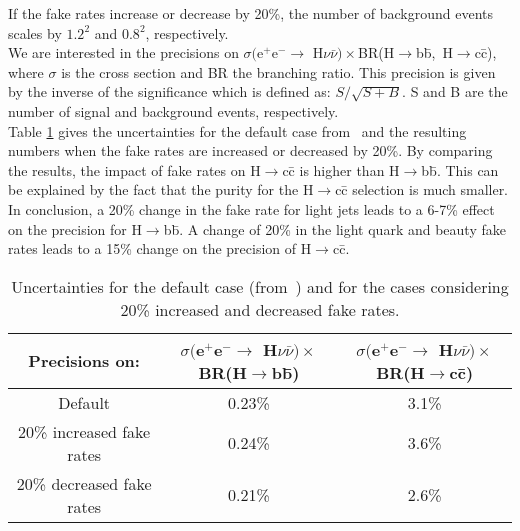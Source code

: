 If the fake rates increase or decrease by 20\%, the number of background events scales by $1.2^{2}$ and $0.8^{2}$, respectively. \\
We are interested in the precisions on $\sigma($e$^+$e$^-\rightarrow$ H$\nu \bar{\nu}) \times $BR(H$\rightarrow$b\={b},~H$\rightarrow$c\={c}), where $\sigma$ is the cross section and BR the branching ratio. This precision is given by the inverse of the significance which is defined as: $S/\sqrt{S+B}$. S and B are the number of signal and background events, respectively. \\
Table \ref{tab:statsUncertainties} gives the uncertainties for the default case from~\cite{Lastovicka:1499128} and the resulting numbers when the fake rates are increased or decreased by 20\%. By comparing the results, the impact of fake rates on H$\rightarrow$c\={c} is higher than H$\rightarrow$b\={b}. This can be explained by the fact that the purity for the H$\rightarrow$c\={c} selection is much smaller. \\
In conclusion, a 20\% change in the fake rate for light jets leads to a 6-7\% effect on the precision for H$\rightarrow$b\={b}. A change of 20\% in the light quark and beauty fake rates leads to a 15\% change on the precision of H$\rightarrow$c\={c}.

\begin{table}[H]
  \begin{center}
    \begin{tabular}{c c c}
      \hline
      Precisions on: & $\sigma($e$^+$e$^- \rightarrow$ H$\nu \bar{\nu}) \times $BR(H$\rightarrow$b\={b}) & $\sigma($e$^+$e$^- \rightarrow$ H$\nu \bar{\nu}) \times $BR(H$\rightarrow$c\={c}) \\ \hline\hline
      Default & 0.23\% & 3.1\% \\
      20\% increased fake rates & 0.24\% & 3.6\% \\
      20\% decreased fake rates & 0.21\% & 2.6\%\\
      \hline
    \end{tabular}
  \end{center}
  \caption{Uncertainties for the default case (from~\cite{Lastovicka:1499128}) and for the cases considering 20\% increased and decreased fake rates. }\label{tab:statsUncertainties}
\end{table}
